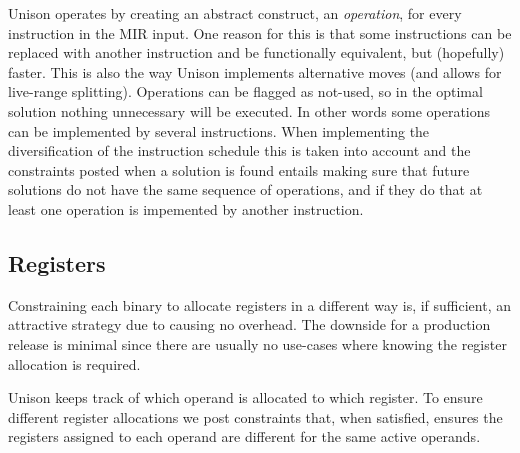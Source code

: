 Unison operates by creating an abstract construct, an \textit{operation}, for every instruction
in the MIR input. One reason for this is that some instructions can be replaced with
another instruction and be functionally equivalent, but (hopefully) faster. This is also
the way Unison implements alternative moves (and allows for live-range splitting).
Operations can be flagged as not-used, so in the optimal solution nothing unnecessary will
be executed. In other words some operations can be implemented by several instructions.
When implementing the diversification of the instruction schedule this is taken into
account and the constraints posted when a solution is found entails making sure that
future solutions do not have the same sequence of operations, and if they do that at least
one operation is impemented by another instruction.

\subsection{Registers}

Constraining each binary to allocate registers in a different way is, if sufficient, an
attractive strategy due to causing no overhead. The downside for a production release is
minimal since there are usually no use-cases where knowing the register allocation is required.

Unison keeps track of which operand is allocated to which register. To ensure different
register allocations we post constraints that, when satisfied, ensures the registers assigned
to each operand are different for the same active operands.
